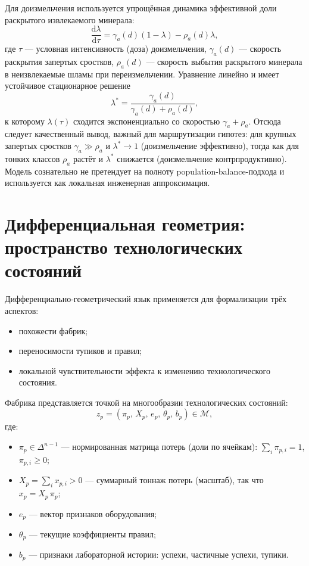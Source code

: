 \documentclass[12pt,a4paper]{article}
\newcommand{\Manifold}{\mathcal{M}}
\begin{document}
Для доизмельчения используется упрощённая динамика эффективной доли
раскрытого извлекаемого минерала:
\[
  \frac{\mathrm{d}\lambda}{\mathrm{d}\tau} =
  \gamma_a(d)(1-\lambda) - \rho_a(d)\lambda,
\]
где \(\tau\) --- условная интенсивность (доза) доизмельчения,
\(\gamma_a(d)\) --- скорость раскрытия запертых сростков,
\(\rho_a(d)\) --- скорость выбытия раскрытого минерала в неизвлекаемые шламы
при переизмельчении. Уравнение линейно и имеет устойчивое стационарное решение
\[
  \lambda^\ast = \frac{\gamma_a(d)}{\gamma_a(d)+\rho_a(d)},
\]
к которому \(\lambda(\tau)\) сходится экспоненциально со скоростью
\(\gamma_a+\rho_a\). Отсюда следует качественный вывод, важный для
маршрутизации гипотез: для крупных запертых сростков
\(\gamma_a \gg \rho_a\) и \(\lambda^\ast \to 1\) (доизмельчение эффективно),
тогда как для тонких классов \(\rho_a\) растёт и \(\lambda^\ast\) снижается
(доизмельчение контрпродуктивно). Модель сознательно не претендует на полноту
population-balance-подхода и используется как локальная инженерная
аппроксимация.

\section{Дифференциальная геометрия: пространство технологических состояний}

Дифференциально-геометрический язык применяется для формализации трёх
аспектов:
\begin{itemize}
  \item похожести фабрик;
  \item переносимости тупиков и правил;
  \item локальной чувствительности эффекта к изменению технологического состояния.
\end{itemize}

Фабрика представляется точкой на многообразии технологических состояний:
\[
  z_p = (\pi_p,\, X_p,\, e_p,\, \theta_p,\, b_p) \in \Manifold,
\]
где:
\begin{itemize}
  \item \(\pi_p \in \Delta^{n-1}\) --- нормированная матрица потерь (доли по ячейкам):
    \(\sum_i \pi_{p,i}=1\), \(\pi_{p,i}\ge 0\);
  \item \(X_p = \sum_i x_{p,i} > 0\) --- суммарный тоннаж потерь (масштаб),
    так что \(x_p = X_p\,\pi_p\);
  \item \(e_p\) --- вектор признаков оборудования;
  \item \(\theta_p\) --- текущие коэффициенты правил;
  \item \(b_p\) --- признаки лабораторной истории: успехи, частичные успехи, тупики.
\end{itemize}
\end{document}
